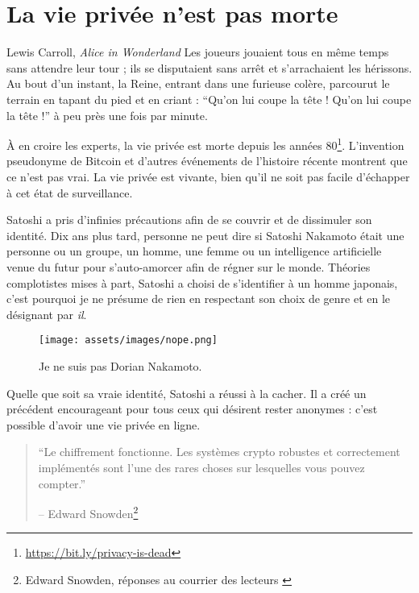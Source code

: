 \chapter{La vie privée n'est pas morte}
\label{les:19}

\begin{chapquote}{Lewis Carroll, \textit{Alice in Wonderland}}
Les joueurs jouaient tous en même temps sans attendre leur tour ; ils se
disputaient sans arrêt et s’arrachaient les hérissons. Au bout d’un instant, la
Reine, entrant dans une furieuse colère, parcourut le terrain en tapant du pied
et en criant : \enquote{Qu’on lui coupe la tête ! Qu’on lui coupe la tête !} à
peu près une fois par minute.
\end{chapquote}

À en croire les experts, la vie privée est morte depuis les années
80\footnote{\url{https://bit.ly/privacy-is-dead}}. L'invention pseudonyme de
Bitcoin et d'autres événements de l'histoire récente montrent que ce n'est pas
vrai. La vie privée est vivante, bien qu'il ne soit pas facile d'échapper à cet
état de surveillance.

Satoshi a pris d'infinies précautions afin de se couvrir et de dissimuler son
identité. Dix ans plus tard, personne ne peut dire si Satoshi Nakamoto était une
personne ou un groupe, un homme, une femme ou un intelligence artificielle venue
du futur pour s'auto-amorcer afin de régner sur le monde. Théories complotistes
mises à part, Satoshi a choisi de s'identifier à un homme japonais, c'est
pourquoi je ne présume de rien en respectant son choix de genre et en le
désignant par \textit{il}.

\begin{figure}
  \texttt{[image: assets/images/nope.png]}
  \caption{Je ne suis pas Dorian Nakamoto.}
  \label{fig:nope}
\end{figure}

Quelle que soit sa vraie identité, Satoshi a réussi à la cacher. Il a créé un
précédent encourageant pour tous ceux qui désirent rester anonymes : c'est
possible d'avoir une vie privée en ligne.

\begin{quotation}\begin{samepage}
\enquote{Le chiffrement fonctionne. Les systèmes crypto robustes et correctement
implémentés sont l'une des rares choses sur lesquelles vous pouvez compter.}
\begin{flushright} -- Edward Snowden\footnote{Edward Snowden, réponses au
courrier des lecteurs \cite{snowden}}
\end{flushright}\end{samepage}\end{quotation}

